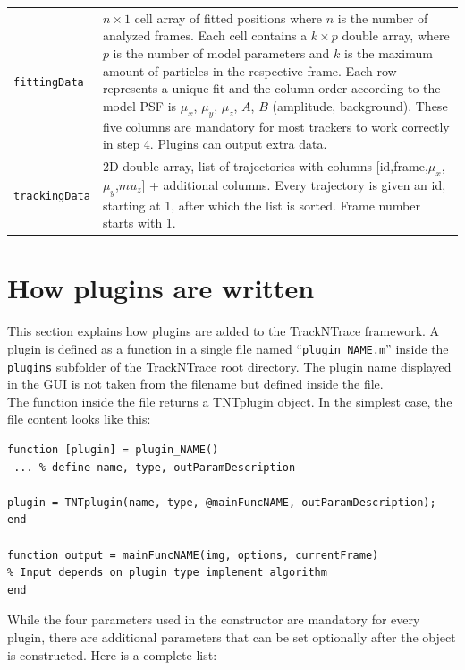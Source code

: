 \documentclass[11pt,onside]{report}
\numberwithin{equation}{chapter}
\begin{document}
\begin{table}[!h]
\begin{tabular}{p{} p{}}
\texttt{fittingData} & $n\times 1$ cell array of fitted positions where $n$ is the number of analyzed frames. Each cell contains a $k\times p$ double array, where $p$ is the number of model parameters and $k$ is the maximum amount of particles in the respective frame. Each row represents a unique fit and the column order according to the model PSF is $\mu_x$, $\mu_y$, $\mu_z$, $A$, $B$ (amplitude, background). These five columns are mandatory for most trackers to work correctly in step 4. Plugins can output extra data.\\
\texttt{trackingData} & 2D double array, list of trajectories with columns  [id,frame,$\mu_x$,$\mu_y$,$mu_z$] + additional columns. Every trajectory is given an id, starting at 1, after which the list is sorted. Frame number starts with 1.\\
\bottomrule
\end{tabular}
\end{table}

\clearpage

\section{How plugins are written}\label{sec:howto_plugins}
This section explains how plugins are added to the TrackNTrace framework. A plugin is defined as a function in a single file named ``\texttt{plugin\_NAME.m}'' inside the \texttt{plugins} subfolder of the TrackNTrace root directory. The plugin name displayed in the GUI is not taken from the filename but defined inside the file.\\

The function inside the file returns a TNTplugin object. In the simplest case, the file content looks like this:
\begin{lstlisting}[style=Matlab-editor]
function [plugin] = plugin_NAME()
 ... % define name, type, outParamDescription

plugin = TNTplugin(name, type, @mainFuncNAME, outParamDescription);
end

function output = mainFuncNAME(img, options, currentFrame) 
% Input depends on plugin type implement algorithm
end
\end{lstlisting}

While the four parameters used in the constructor are mandatory for every plugin, there are additional parameters that can be set optionally after the object is constructed. Here is a complete list:
\end{document}

